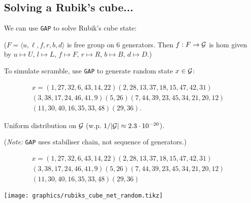 \subsection{Solving a Rubik's cube...}

\begin{slide}
    We can use \texttt{GAP} to solve Rubik's cube state: \pause

    {\scriptsize }

    ($F = \langle u,\ell,f,r,b,d \rangle$ is free group on 6 generators. Then $f : F \to \mathcal{G}$ is hom given by $u \mapsto U$, $l \mapsto L$, $f \mapsto F$, $r \mapsto R$, $b \mapsto B$, $d \mapsto D$.)
\end{slide}

\begin{slide}
    To simulate scramble, use \texttt{GAP} to generate random state $x \in \mathcal{G}$: \pause

    {\scriptsize }
    \vspace{-0.5cm}

    {\footnotesize \begin{multline*}
            x = (1,27,32,6,43,14,22)(2,28,13,37,18,15,47,42,31)\\
            (3,38,17,24,46,41,9)(5,26)(7,44,39,23,45,34,21,20,12)\\
            (11,30,40,16,35,33,48)(29,36).
        \end{multline*}} \pause
    
    \vspace{-0.5cm}
    Uniform distribution on $\mathcal{G}$ (w.p. $1/|\mathcal{G}| \approx 2.3 \cdot 10^{-20}$).

    (\textit{Note:} \texttt{GAP} uses stabiliser chain, not sequence of generators.)
\end{slide}

\begin{slide}
    {\footnotesize \begin{multline*}
            x = (1,27,32,6,43,14,22)(2,28,13,37,18,15,47,42,31)\\
            (3,38,17,24,46,41,9)(5,26)(7,44,39,23,45,34,21,20,12)\\
            (11,30,40,16,35,33,48)(29,36)
        \end{multline*}}
    \vspace{-1cm}

    \begin{center}
        \texttt{[image: graphics/rubiks\_cube\_net\_random.tikz]}%
    \end{center}
\end{slide}

